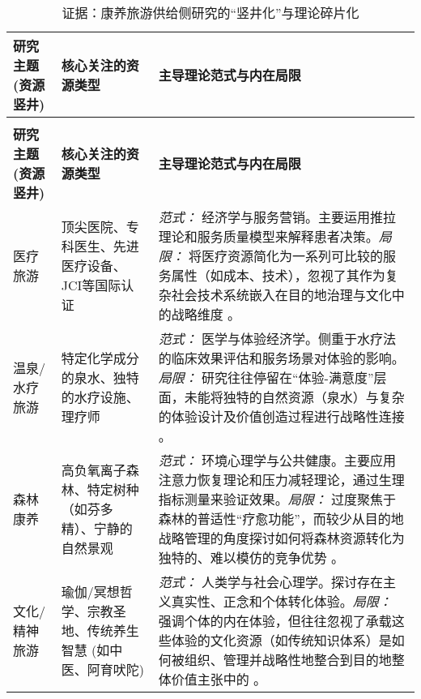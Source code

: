 \documentclass[UTF8, 12pt, a4paper, twoside]{ctexart}
\begin{document}
\begin{longtable}{>{\raggedright\arraybackslash}p{} >{\raggedright\arraybackslash}p{} >{\raggedright\arraybackslash}p{}}
	\caption{证据：康养旅游供给侧研究的“竖井化”与理论碎片化} \label{tab:fragmentation_evidence} \\
	\toprule
	\textbf{研究主题 (资源竖井)} & \textbf{核心关注的资源类型} & \textbf{主导理论范式与内在局限} \\
	\midrule
	\endfirsthead
	\multicolumn{3}{c}{\tablename~\thetable\ (续)} \\
	\toprule
	\textbf{研究主题 (资源竖井)} & \textbf{核心关注的资源类型} & \textbf{主导理论范式与内在局限} \\
	\midrule
	\endhead
	\bottomrule
	\endfoot
	\bottomrule
	\endlastfoot

	医疗旅游 & 顶尖医院、专科医生、先进医疗设备、JCI等国际认证 & \textit{范式：} 经济学与服务营销。主要运用推拉理论和服务质量模型来解释患者决策。\newline \textit{局限：} 将医疗资源简化为一系列可比较的服务属性（如成本、技术），忽视了其作为复杂社会技术系统嵌入在目的地治理与文化中的战略维度 \parencite{connell2006medical, jalali2025health}。 \\
	\addlinespace
	温泉/水疗旅游 & 特定化学成分的泉水、独特的水疗设施、理疗师 & \textit{范式：} 医学与体验经济学。侧重于水疗法的临床效果评估和服务场景对体验的影响。\newline \textit{局限：} 研究往往停留在“体验-满意度”层面，未能将独特的自然资源（泉水）与复杂的体验设计及价值创造过程进行战略性连接 \parencite{chen2013investigating, dryglas2024critical, mi2019evaluating}。 \\
	\addlinespace
	森林康养 & 高负氧离子森林、特定树种（如芬多精）、宁静的自然景观 & \textit{范式：} 环境心理学与公共健康。主要应用注意力恢复理论和压力减轻理论，通过生理指标测量来验证效果。\newline \textit{局限：} 过度聚焦于森林的普适性“疗愈功能”，而较少从目的地战略管理的角度探讨如何将森林资源转化为独特的、难以模仿的竞争优势 \parencite{sorokaImportanceForestResources2016b, ohe2017evaluating, liEffectFrugalityCognition2022a}。 \\
	\addlinespace
	文化/精神旅游 & 瑜伽/冥想哲学、宗教圣地、传统养生智慧 (如中医、阿育吠陀) & \textit{范式：} 人类学与社会心理学。探讨存在主义真实性、正念和个体转化体验。\newline \textit{局限：} 强调个体的内在体验，但往往忽视了承载这些体验的文化资源（如传统知识体系）是如何被组织、管理并战略性地整合到目的地整体价值主张中的 \parencite{norman2017meditation, bowers2017yoga, kaspar2023odysseys, peng2025wellness}。 \\

\end{longtable}
\end{document}
